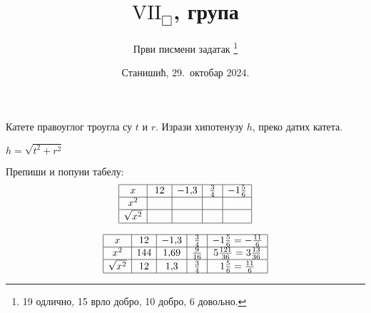 \documentclass[12pt,a5paper,addpoints]{exam}
\title{$\mathrm{VII}_\Box$, група \grupa 1234}
\author{Први писмени задатак
 \thanks{
  19 одлично,
  15 врло добро,
  10 добро,
   6 довољно.
 }
}
\date{Станишић, 29.\ октобар 2024.}
\def\grupa#1#2#3#4{#1}
\begin{document}
\maketitle
\thispagestyle{headandfoot}

\noindent \gradetable[h]

\begin{questions}

\question[1] %
 Катете правоуглог троугла су $\grupa tshv$ и $\grupa rdts$.
 Изрази хипотенузу $\grupa hvrd$, преко датих катета.
 \begin{solution}
  $
   \grupa
    {h = \sqrt{t^2 + r^2}}
    {v = \sqrt{s^2 + d^2}}
    {r = \sqrt{h^2 + t^2}}
    {d = \sqrt{v^2 + s^2}}
  $
 \end{solution}

\question[4] %
 Препиши и попуни табелу:
 $$
  \begin{array}{|*5{c|}} \hline
   x & \grupa
    {12 & -1,\!3 & \frac 34 & -1 \frac 56}
    {11 & -1,\!4 & \frac 35 & -2 \frac 23}
    {14 & -1,\!1 & \frac 56 & -1 \frac 34}
    {13 & -1,\!2 & \frac 25 & -3 \frac 12}
   \\\hline
   x^2 & \phantom{121} & \phantom{1,\!44} & \phantom{\frac 4{25}} & \phantom{5 \frac 49} \\\hline
   \sqrt{x^2} & & & & \\\hline
  \end{array}
 $$
 \begin{solution}
 $$
  \begin{array}{|*5{c|}} \hline
   x & \grupa
    {12 & -1,\!3 & \frac 34 & -1 \frac 56 = - \frac{11}6}
    {11 & -1,\!4 & \frac 35 & -2 \frac 23 = - \frac 83}
    {14 & -1,\!1 & \frac 56 & -1 \frac 34 = - \frac 74}
    {13 & -1,\!2 & \frac 25 & -3 \frac 12 = - \frac 72}
   \\\hline
   x^2 & \grupa
    {144 & 1,\!69 & \frac 9{16} & 5 \frac{121}{36} = 3 \frac{13}{36}}
    {121 & 1,\!96 & \frac 9{25} & 5 \frac{64}9 = 7 \frac 19}
    {196 & 1,\!21 & \frac{25}{36} & 5 \frac{49}{16} = 3 \frac 1{16}}
    {169 & 1,\!44 & \frac 4{25} & 5 \frac{49}4 = 12 \frac 14}
   \\\hline
   \sqrt{x^2} & \grupa
    {12 & 1,\!3 & \frac 34 & 1 \frac 56 = \frac{11}6}
    {11 & 1,\!4 & \frac 35 & 2 \frac 23 = \frac 83}
    {14 & 1,\!1 & \frac 56 & 1 \frac 34 = \frac 74}
    {13 & 1,\!2 & \frac 25 & 3 \frac 12 = \frac 72}
   \\\hline
  \end{array}
 $$
 \end{solution}


\end{questions}
\end{document}
